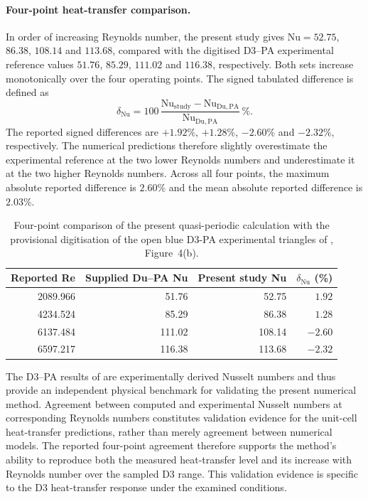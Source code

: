 \paragraph{Four-point heat-transfer comparison.}
In order of increasing Reynolds number, the present study gives $\mathrm{Nu}=52.75$, $86.38$, $108.14$ and $113.68$, compared with the digitised D3--PA experimental reference values $51.76$, $85.29$, $111.02$ and $116.38$, respectively. Both sets increase monotonically over the four operating points. The signed tabulated difference is defined as
\[
 \delta_{\mathrm{Nu}}=100\,
 \frac{\mathrm{Nu}_{\mathrm{study}}-\mathrm{Nu}_{\mathrm{Du,PA}}}
 {\mathrm{Nu}_{\mathrm{Du,PA}}}\,\%.
\]
The reported signed differences are $+1.92\%$, $+1.28\%$, $-2.60\%$ and $-2.32\%$, respectively. The numerical predictions therefore slightly overestimate the experimental reference at the two lower Reynolds numbers and underestimate it at the two higher Reynolds numbers. Across all four points, the maximum absolute reported difference is $2.60\%$ and the mean absolute reported difference is $2.03\%$.
\begin{table}[H]
\centering
\caption{Four-point comparison of the present quasi-periodic calculation with the provisional digitisation of the open blue D3-PA experimental triangles of \citet{du2025}, Figure~4(b).}
\label{tab:du-validation-comparison}
\small
\renewcommand{\arraystretch}{1.15}
\begin{tabular}{rrrr}
\hline
\textbf{Reported Re} & \textbf{Supplied Du--PA Nu} & \textbf{Present study Nu} & \textbf{$\delta_{\mathrm{Nu}}$ (\%)}\\
\hline
2089.966 & 51.76  & 52.75 & $1.92$\\
4234.524 & 85.29  & 86.38 & $1.28$\\
6137.484 & 111.02 & 108.14 & $-2.60$\\
6597.217 & 116.38 & 113.68 & $-2.32$\\
\hline
\end{tabular}
\end{table}

The D3--PA results of \citet{du2025} are experimentally derived Nusselt numbers and thus provide an independent physical benchmark for validating the present numerical method. Agreement between computed and experimental Nusselt numbers at corresponding Reynolds numbers constitutes validation evidence for the unit-cell heat-transfer predictions, rather than merely agreement between numerical models. The reported four-point agreement therefore supports the method's ability to reproduce both the measured heat-transfer level and its increase with Reynolds number over the sampled D3 range. This validation evidence is specific to the D3 heat-transfer response under the examined conditions.

